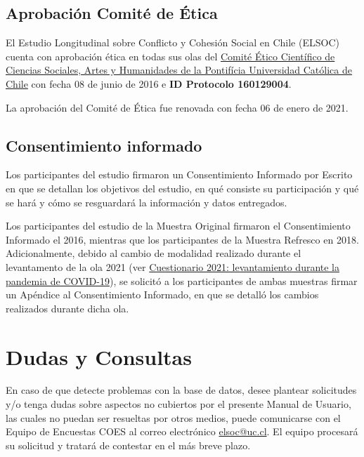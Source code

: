 \documentclass[
  12pt,
]{article}
\begin{document}
\hypertarget{aprobaciuxf3n-comituxe9-de-uxe9tica}{%
\subsection{Aprobación Comité de Ética}\label{aprobaciuxf3n-comituxe9-de-uxe9tica}}

El Estudio Longitudinal sobre Conflicto y Cohesión Social en Chile (ELSOC) cuenta con aprobación ética en todas sus olas del \href{http://eticayseguridad.uc.cl/comite-etico-cientifico-en-ciencias-sociales-artes-y-humanidades.html}{Comité Ético Científico de Ciencias Sociales, Artes y Humanidades de la Pontifícia Universidad Católica de Chile} con fecha 08 de junio de 2016 e \textbf{ID Protocolo 160129004}.

La aprobación del Comité de Ética fue renovada con fecha 06 de enero de 2021.

\hypertarget{consentimiento-informado}{%
\subsection{Consentimiento informado}\label{consentimiento-informado}}

Los participantes del estudio firmaron un Consentimiento Informado por Escrito en que se detallan los objetivos del estudio, en qué consiste su participación y qué se hará y cómo se resguardará la información y datos entregados.

Los participantes del estudio de la Muestra Original firmaron el Consentimiento Informado el 2016, mientras que los participantes de la Muestra Refresco en 2018. Adicionalmente, debido al cambio de modalidad realizado durante el levantamento de la ola 2021 (ver \protect\hyperlink{instrumento-covid}{Cuestionario 2021: levantamiento durante la pandemia de COVID-19}), se solicitó a los participantes de ambas muestras firmar un Apéndice al Consentimiento Informado, en que se detalló los cambios realizados durante dicha ola.

\newpage

\hypertarget{dudas-y-consultas}{%
\section{Dudas y Consultas}\label{dudas-y-consultas}}

En caso de que detecte problemas con la base de datos, desee plantear solicitudes y/o tenga dudas sobre aspectos no cubiertos por el presente Manual de Usuario, las cuales no puedan ser resueltas por otros medios, puede comunicarse con el Equipo de Encuestas COES al correo electrónico \url{elsoc@uc.cl}. El equipo procesará su solicitud y tratará de contestar en el más breve plazo.
\end{document}
